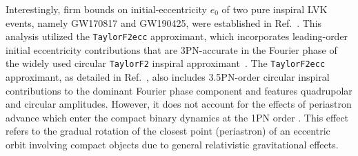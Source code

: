 \documentclass[aps,prd,twocolumn,superscriptaddress,groupedaddress,nofootinbib,showpacs,eqsecnum,useAms]{revtex4-2}
\begin{document}
Interestingly, firm bounds on initial-eccentricity $e_0$ of two pure inspiral LVK events, namely GW170817 and GW190425, were established in Ref.~\cite{LNB}.
This analysis utilized the \texttt{TaylorF2ecc} approximant, which incorporates leading-order initial eccentricity contributions that are 3PN-accurate in the Fourier phase of the widely used 
circular \texttt{TaylorF2} inspiral approximant~\cite{MF16}.
The \texttt{TaylorF2ecc} approximant, as detailed in Ref.~\cite{Favata2022,MF16}, also includes 3.5PN-order circular inspiral contributions to the dominant Fourier phase component and features quadrupolar and circular amplitudes. However, it does not account for the effects of periastron advance which enter the compact binary dynamics at the 
1PN order \cite{DD85}. 
This effect refers to the gradual rotation of the closest point (periastron) of an eccentric orbit involving compact objects due to general relativistic gravitational effects.
\end{document}
